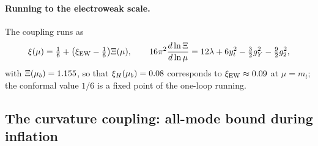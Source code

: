 \paragraph{Running to the electroweak scale.}
The coupling runs as~\cite{Herranen:2014cua,Mantziris:2020rzh}
\begin{equation}
\xi(\mu)=\tfrac16+\bigl(\xi_{\rm EW}-\tfrac16\bigr)\Xi(\mu),\qquad
16\pi^2\frac{d\ln\Xi}{d\ln\mu}=12\lambda+6y_t^2-\tfrac32g_Y^2-\tfrac92g_2^2,
\label{eq:rb-xirun}
\end{equation}
with $\Xi(\mu_b)=1.155$, so that $\xi_H(\mu_b)=0.08$ corresponds to $\xi_{\rm EW}\approx0.09$ at $\mu=m_t$; the conformal value $1/6$ is a fixed point of the one-loop running. %

\subsection{The curvature coupling: all-mode bound during inflation}
\label{sec:rb-xiinf}

